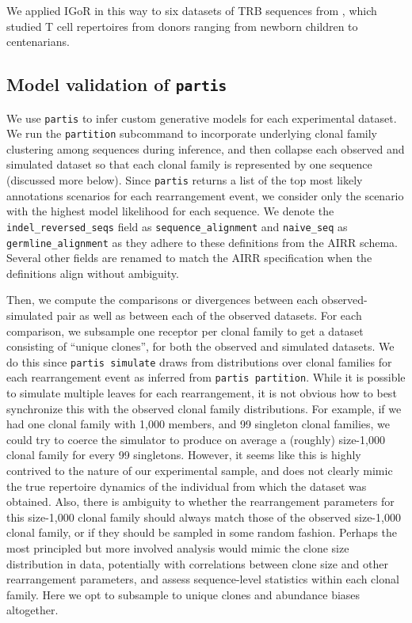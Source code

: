 \documentclass{article}
\begin{document}
We applied IGoR in this way to six datasets of TRB sequences from \cite{Britanova2016-iw}, which studied T cell repertoires from donors ranging from newborn children to centenarians.

\subsection*{Model validation of \texttt{partis}}

We use \texttt{partis} to infer custom generative models for each experimental dataset.
We run the \texttt{partition} subcommand to incorporate underlying clonal family clustering among sequences during inference, and then collapse each observed and simulated dataset so that each clonal family is represented by one sequence (discussed more below).
Since \texttt{partis} returns a list of the top most likely annotations scenarios for each rearrangement event, we consider only the scenario with the highest model likelihood for each sequence.
We denote the \texttt{indel\_reversed\_seqs} field as \texttt{sequence\_alignment} and \texttt{naive\_seq} as \texttt{germline\_alignment} as they adhere to these definitions from the AIRR schema.
Several other fields are renamed to match the AIRR specification when the definitions align without ambiguity.

Then, we compute the comparisons or divergences between each observed-simulated pair as well as between each of the observed datasets.
For each comparison, we subsample one receptor per clonal family to get a dataset consisting of ``unique clones'', for both the observed and simulated datasets.
We do this since \texttt{partis simulate} draws from distributions over clonal families for each rearrangement event as inferred from \texttt{partis partition}.
While it is possible to simulate multiple leaves for each rearrangement, it is not obvious how to best synchronize this with the observed clonal family distributions.
For example, if we had one clonal family with 1,000 members, and 99 singleton clonal families, we could try to coerce the simulator to produce on average a (roughly) size-1,000 clonal family for every 99 singletons.
However, it seems like this is highly contrived to the nature of our experimental sample, and does not clearly mimic the true repertoire dynamics of the individual from which the dataset was obtained.
Also, there is ambiguity to whether the rearrangement parameters for this size-1,000 clonal family should always match those of the observed size-1,000 clonal family, or if they should be sampled in some random fashion.
Perhaps the most principled but more involved analysis would mimic the clone size distribution in data, potentially with correlations between clone size and other rearrangement parameters, and assess sequence-level statistics within each clonal family.
Here we opt to subsample to unique clones and abundance biases altogether.
\end{document}
